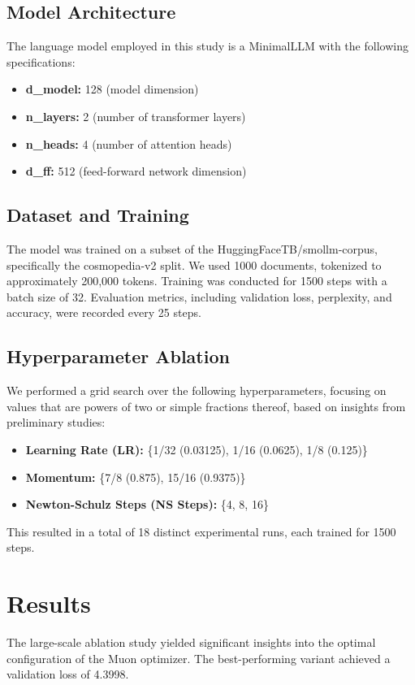 \documentclass{article}
\begin{document}
\subsection{Model Architecture}
The language model employed in this study is a MinimalLLM with the following specifications:
\begin{itemize}
    \item \textbf{d\_model:} 128 (model dimension)
    \item \textbf{n\_layers:} 2 (number of transformer layers)
    \item \textbf{n\_heads:} 4 (number of attention heads)
    \item \textbf{d\_ff:} 512 (feed-forward network dimension)
\end{itemize}

\subsection{Dataset and Training}
The model was trained on a subset of the HuggingFaceTB/smollm-corpus, specifically the cosmopedia-v2 split. We used 1000 documents, tokenized to approximately 200,000 tokens. Training was conducted for 1500 steps with a batch size of 32. Evaluation metrics, including validation loss, perplexity, and accuracy, were recorded every 25 steps.

\subsection{Hyperparameter Ablation}
We performed a grid search over the following hyperparameters, focusing on values that are powers of two or simple fractions thereof, based on insights from preliminary studies:
\begin{itemize}
    \item \textbf{Learning Rate (LR):} \{1/32 (0.03125), 1/16 (0.0625), 1/8 (0.125)\}
    \item \textbf{Momentum:} \{7/8 (0.875), 15/16 (0.9375)\}
    \item \textbf{Newton-Schulz Steps (NS Steps):} \{4, 8, 16\}
\end{itemize}
This resulted in a total of 18 distinct experimental runs, each trained for 1500 steps.

\section{Results}
The large-scale ablation study yielded significant insights into the optimal configuration of the Muon optimizer. The best-performing variant achieved a validation loss of 4.3998.
\end{document}
